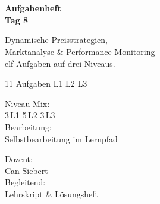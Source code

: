 \documentclass[11pt,a4paper,oneside]{article}
\begin{document}
\begin{titlepage}
  \pagestyle{empty}
  \vspace*{1.5cm}
  \\[2pt]
  \noindent{\color{lpAccent}\rule{\linewidth}{1.2pt}}\\[4pt]

  \vspace{3cm}
  {\sffamily\fontsize{30}{34}\selectfont\bfseries\color{lpInk}Aufgabenheft\\Tag 8\par}

  \vspace{0.7cm}
  {\sffamily\large\color{lpGray}Dynamische Preisstrategien,\\Marktanalyse \& Performance-Monitoring\\\textendash{} elf Aufgaben auf drei Niveaus.\par}

  \vspace{1.5cm}
  {\caveatfont\LARGE\color{lpAmber}11 Aufgaben \textperiodcentered{} L1 \textperiodcentered{} L2 \textperiodcentered{} L3}\par

  \vfill

  \noindent\begin{minipage}{0.55\linewidth}
    {\sffamily\footnotesize\color{lpGray}Niveau-Mix:}\\
    {\sffamily\small\color{lpInk}3\,\textsf{L1} \textperiodcentered{} 5\,\textsf{L2} \textperiodcentered{} 3\,\textsf{L3}}\\[10pt]
    {\sffamily\footnotesize\color{lpGray}Bearbeitung:}\\
    {\sffamily\small\color{lpInk}Selbstbearbeitung im Lernpfad}
  \end{minipage}\hfill
  \begin{minipage}{0.4\linewidth}
    \raggedleft
    {\sffamily\footnotesize\color{lpGray}Dozent:}\\
    {\sffamily\small\color{lpInk}Can Siebert}\\[10pt]
    {\sffamily\footnotesize\color{lpGray}Begleitend:}\\
    {\sffamily\small\color{lpInk}Lehrskript \& Lösungsheft}
  \end{minipage}

  \vspace{0.5cm}
  \noindent{\color{lpAccent}\rule{\linewidth}{0.6pt}}
\end{titlepage}
\end{document}
